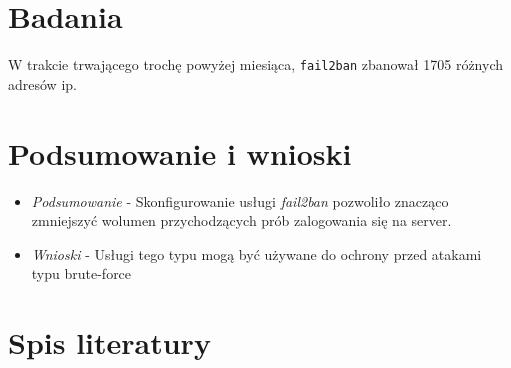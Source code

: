 \documentclass[12pt,a4paper]{article}
\begin{document}
\section{Badania}

W trakcie trwającego trochę powyżej miesiąca, \texttt{fail2ban} zbanował 1705
różnych adresów ip. 

\newpage

\section{Podsumowanie i wnioski}

\begin{itemize}
  \item \textit{Podsumowanie} - Skonfigurowanie usługi \emph{fail2ban} pozwoliło 
    znacząco zmniejszyć wolumen przychodzących prób zalogowania się na server.
\item \textit{Wnioski} - Usługi tego typu mogą być używane do ochrony przed
  atakami typu brute-force
\end{itemize}

\newpage
\section{Spis literatury}

\printbibliography[heading=none] 
\end{document}
